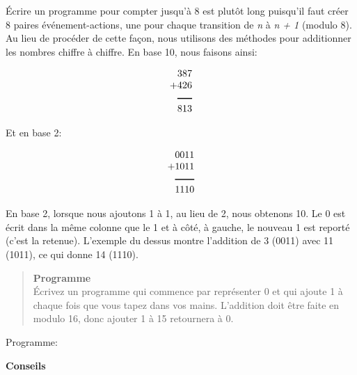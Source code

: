 Écrire un programme pour compter jusqu'à 8 est plutôt long puisqu'il faut créer 8 paires événement-actions, une pour chaque transition de \emph{n} à \emph{n + 1} (modulo 8). Au lieu de procéder de cette façon, nous utilisons des méthodes pour additionner les nombres chiffre à chiffre. En base 10, nous faisons ainsi:

\begin{displaymath}
\begin{array}{r}
387\\
+426\\
\rule[1pt]{1.5em}{1pt}\\
813\\
\end{array}
\end{displaymath}

Et en base 2:

\begin{displaymath}
\begin{array}{r}
0011\\
+1011\\
\rule[1pt]{2em}{1pt}\\
1110\\
\end{array}
\end{displaymath}

En base 2, lorsque nous ajoutons 1 à 1, au lieu de 2, nous obtenons 10. Le 0 est écrit dans la même colonne que le 1 et à côté, à gauche, le nouveau 1 est reporté (c'est la retenue). L'exemple du dessus montre l'addition de 3 (0011) avec 11 (1011), ce qui donne 14 (1110).

\begin{quote}
\textbf{Programme}\\
Écrivez un programme qui commence par représenter 0 et qui ajoute 1 à chaque fois que vous tapez dans vos mains. L'addition doit être faite en modulo 16, donc ajouter 1 à 15 retournera à 0.
\end{quote}

{\raggedleft \hfill Programme: }

\textbf{Conseils}

